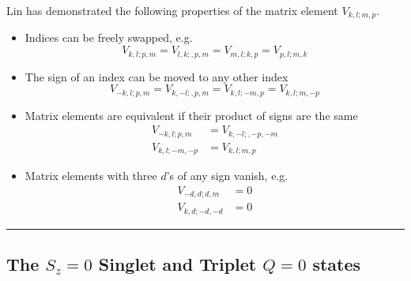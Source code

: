 \documentclass[
  letterpaper,
  DIV=11,
  numbers=noendperiod]{scrartcl}
\begin{document}
\begin{tcolorbox}[enhanced jigsaw, arc=.35mm, bottomrule=.15mm, bottomtitle=1mm, breakable, colback=white, colbacktitle=quarto-callout-note-color!10!white, colframe=quarto-callout-note-color-frame, coltitle=black, left=2mm, leftrule=.75mm, opacityback=0, opacitybacktitle=0.6, rightrule=.15mm, title=\textcolor{quarto-callout-note-color}{\faInfo}\hspace{0.5em}{Symmetries of the matrix element \(V_{k,l;m,p}\)}, titlerule=0mm, toprule=.15mm, toptitle=1mm]

Lin has demonstrated the following properties of the matrix element
\(V_{k,l;m,p}\).

\begin{itemize}
\item
  Indices can be freely swapped, e.g. \begin{equation}
  V_{k,l;p,m}=V_{l,k;,p,m}=V_{m,l;k,p}=V_{p,l;m,k}
  \end{equation}
\item
  The sign of an index can be moved to any other index \begin{equation}
  V_{-k,l;p,m}=V_{k,-l;,p,m}=V_{k,l;-m,p}=V_{k,l;m,-p}
  \end{equation}
\item
  Matrix elements are equivalent if their product of signs are the same
  \begin{align}
  V_{-k,l;p,m}&=V_{k,-l;,-p,-m}\\
  V_{k,l;-m,-p}&=V_{k,l;m,p}
  \end{align}
\item
  Matrix elements with three \(d\)'s of any sign vanish, e.g.
  \begin{align}
  V_{-d,d;d,m}&=0\\
  V_{k,d;-d,-d}&=0
  \end{align}
\end{itemize}

\end{tcolorbox}

\begin{center}\rule{0.5\linewidth}{0.5pt}\end{center}

\subsection{\texorpdfstring{The \(S_z=0\) Singlet and Triplet \(Q=0\)
states}{The S\_z=0 Singlet and Triplet Q=0 states}}\label{the-s_z0-singlet-and-triplet-q0-states}
\end{document}
